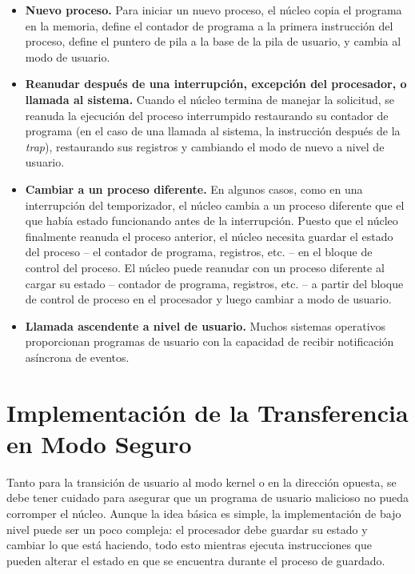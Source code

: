 \documentclass[10pt]{book}
\begin{document}
\begin{itemize}
\item \textbf{Nuevo proceso.} Para iniciar un nuevo proceso, el núcleo copia el programa en la memoria, define el contador de programa a la primera instrucción del proceso, define el puntero de pila a la base de la pila de usuario, y cambia al modo de usuario.

\item \textbf{Reanudar después de una interrupción, excepción del procesador, o llamada al sistema.} Cuando el núcleo termina de manejar la solicitud, se reanuda la ejecución del proceso interrumpido restaurando su contador de programa (en el caso de una llamada al sistema, la instrucción después de la \textit{trap}), restaurando sus registros y cambiando el modo de nuevo a nivel de usuario.

\item \textbf{Cambiar a un proceso diferente.} En algunos casos, como en una interrupción del temporizador, el núcleo cambia a un proceso diferente que el que había estado funcionando antes de la interrupción. Puesto que el núcleo finalmente reanuda el proceso anterior, el núcleo necesita guardar el estado del proceso -- el contador de programa, registros, etc. -- en el bloque de control del proceso. El núcleo puede reanudar con un proceso diferente al cargar su estado -- contador de programa, registros, etc. -- a partir del bloque de control de proceso en el procesador y luego cambiar a modo de usuario.

\item \textbf{Llamada ascendente a nivel de usuario.} Muchos sistemas operativos proporcionan programas de usuario con la capacidad de recibir notificación asíncrona de eventos.
\end{itemize}

\section{Implementación de la Transferencia en Modo Seguro}
Tanto para la transición de usuario al modo kernel o en la dirección opuesta, se debe tener cuidado para asegurar que un programa de usuario malicioso no pueda corromper el núcleo. Aunque la idea básica es simple, la implementación de bajo nivel puede ser un poco compleja: el procesador debe guardar su estado y cambiar lo que está haciendo, todo esto mientras ejecuta instrucciones que pueden alterar el estado en que se encuentra durante el proceso de guardado.
\end{document}
